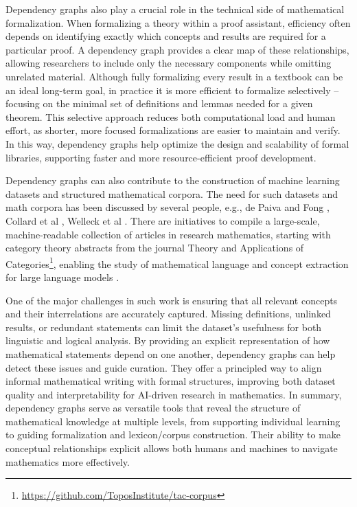 \documentclass{article}
\begin{document}
Dependency graphs also play a crucial role in the technical side of mathematical formalization. 
When formalizing a theory within a proof assistant, efficiency often depends on identifying exactly which concepts and results are required for a particular proof. 
A dependency graph provides a clear map of these relationships, allowing researchers to include only the necessary components while omitting unrelated material. 
Although fully formalizing every result in a textbook can be an ideal long-term goal, in practice it is more efficient to formalize selectively -- focusing on the minimal set of definitions and lemmas needed for a given theorem. 
This selective approach reduces both computational load and human effort, as shorter, more focused formalizations are easier to maintain and verify. 
In this way, dependency graphs help optimize the design and scalability of formal libraries, supporting faster and more resource-efficient proof development.

Dependency graphs can also contribute to the construction of machine learning datasets and structured mathematical corpora. The need for such datasets and math corpora has been discussed by several people, e.g., de Paiva and Fong \cite{fong2021}, Collard et al \cite{collard2024}, Welleck et al \cite{welleck2021}. 
There are initiatives to compile a large-scale, machine-readable collection of articles in research mathematics, starting with category theory abstracts from the journal Theory and Applications of Categories\footnote{\url{https://github.com/ToposInstitute/tac-corpus}}, enabling the study of mathematical language and concept extraction for large language models \cite{depaiva2023}. 

One of the major challenges in such work is ensuring that all relevant concepts and their interrelations are accurately captured. Missing definitions, unlinked results, or redundant statements can limit the dataset’s usefulness for both linguistic and logical analysis. 
By providing an explicit representation of how mathematical statements depend on one another, dependency graphs can help detect these issues and guide curation.
They offer a principled way to align informal mathematical writing with formal structures, improving both dataset quality and interpretability for AI-driven research in mathematics.
In summary, dependency graphs serve as versatile tools that reveal the structure of mathematical knowledge at multiple levels, from supporting individual learning to guiding formalization and lexicon/corpus construction. 
Their ability to make conceptual relationships explicit allows both humans and machines to navigate mathematics more effectively.
\end{document}

